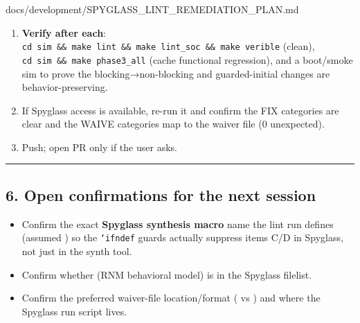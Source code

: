 \begin{relocated}{docs/development/SPYGLASS_LINT_REMEDIATION_PLAN.md}
\begin{enumerate}
  \begin{itemize}
  \tightlist
  \item
    \texttt{[RTL]\ Remove\ default\_\allowbreak{}nettype\ directives\ (Spyglass\ IND)}
    --- item A.
  \item
    \texttt{[RTL]\ Non-\allowbreak{}blocking\ reset\ loops\ in\ i/\allowbreak{}d-\allowbreak{}cache\ valid/\allowbreak{}dirty\ arrays}
    --- item B.
  \item
    \texttt{[RTL]\ Guard\ non-\allowbreak{}synth\ initial/\allowbreak{}\$fatal/\allowbreak{}\$readmemh\ blocks}
    --- items C/D.
  \item
    \texttt{[RTL]\ Fix\ empty\ blocks,\allowbreak{}\ size\ warp\_\allowbreak{}scheduler\ index,\allowbreak{}\ signed/\allowbreak{}unsigned\ casts}
    --- items E/F/G.
  \item
    \texttt{[Doc]\ Spyglass\ waiver\ file\ +\allowbreak{}\ coding-\allowbreak{}guideline\ updates}
    --- §3/§4.
  \end{itemize}
\item
  \textbf{Verify after each}:
  \texttt{cd\ sim\ \&\&\ make\ lint\ \&\&\ make\ lint\_\allowbreak{}soc\ \&\&\ make\ verible}
  (clean), \texttt{cd\ sim\ \&\&\ make\ phase3\_\allowbreak{}all} (cache
  functional regression), and a  boot/\allowbreak{}smoke
  sim to prove the blocking→non-blocking and guarded-initial changes are
  behavior-preserving.
\item
  If Spyglass access is available, re-run it and confirm the FIX
  categories are clear and the WAIVE categories map to the waiver file
  (0 unexpected).
\item
  Push; open PR only if the user asks.
\end{enumerate}

\begin{center}\rule{0.5\linewidth}{0.5pt}\end{center}

\subsection{6. Open confirmations for the next session}\label{um:guide:spyglass-lint-remediation:6-open-confirmations-for-the-next-session}

\begin{itemize}
\tightlist
\item
  Confirm the exact \textbf{Spyglass synthesis macro} name the lint run
  defines (assumed ) so the \texttt{`ifndef} guards
  actually suppress items C/D in Spyglass, not just in the synth tool.
\item
  Confirm whether  (RNM behavioral model) is
  in the Spyglass filelist.
\item
  Confirm the preferred waiver-file location/\allowbreak{}format
  ( vs ) and where
  the Spyglass run script lives.
\end{itemize}
\end{relocated}

